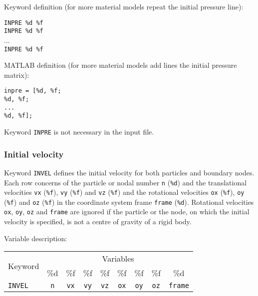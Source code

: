 Keyword definition (for more material models repeat the initial pressure line):

\begin{tcolorbox}
\texttt{INPRE \%d \%f} \\
\texttt{INPRE \%d \%f} \\
... \\
\texttt{INPRE \%d \%f}
\end{tcolorbox}

MATLAB definition (for more material models add lines the initial pressure matrix):

\begin{tcolorbox}
\texttt{inpre = [\%d, \%f; \\
\%d, \%f; \\
... \\
\%d, \%f];}
\end{tcolorbox}

Keyword \texttt{INPRE} is not necessary in the input file.

\newpage


\subsubsection{Initial velocity}

Keyword \texttt{INVEL} defines the initial velocity for both particles and boundary nodes. Each row concerns of the particle or nodal number \texttt{n} (\texttt{\%d}) and the translational velocities \texttt{vx} (\texttt{\%f}), \texttt{vy} (\texttt{\%f}) and \texttt{vz} (\texttt{\%f}) and the rotational velocities \texttt{ox} (\texttt{\%f}), \texttt{oy} (\texttt{\%f}) and \texttt{oz} (\texttt{\%f}) in the coordinate system frame \texttt{frame} (\texttt{\%d}). Rotational velocities \texttt{ox}, \texttt{oy}, \texttt{oz} and \texttt{frame} are ignored if the particle or the node, on which the initial velocity is specified, is not a centre of gravity of a rigid body.

Variable description:

\begin{tabular}{|l|c|c|c|c|c|c|c|c|}
\hline
\multirow{2}{*}{Keyword} & \multicolumn{8}{c|}{Variables} \\ \cline{2-9}
& \%d & \%f & \%f & \%f & \%f & \%f & \%f & \%d \\ \hline
\texttt{INVEL} & \texttt{n} & \texttt{vx} & \texttt{vy} & \texttt{vz} & \texttt{ox} & \texttt{oy} & \texttt{oz} & \texttt{frame} \\ \hline
\end{tabular}

